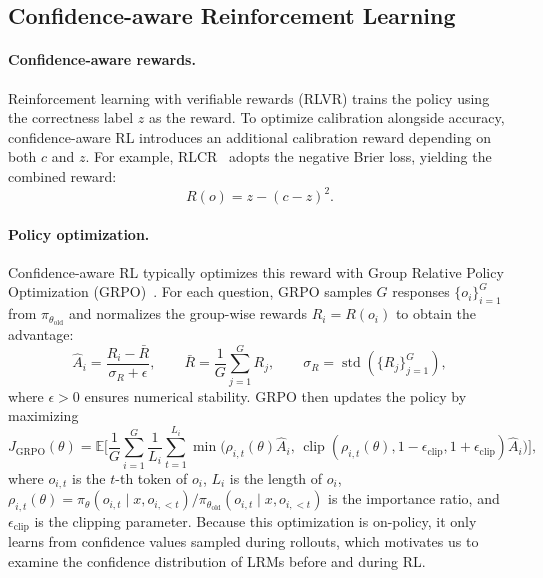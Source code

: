 \documentclass{article} %
\begin{document}
\subsection{Confidence-aware Reinforcement Learning}

\paragraph{Confidence-aware rewards.}
Reinforcement learning with verifiable rewards (RLVR) trains the policy using the correctness label $z$ as the reward.
To optimize calibration alongside accuracy, confidence-aware RL introduces an additional calibration reward depending on both $c$ and $z$.
For example, RLCR~\citep{damani2026beyond} adopts the negative Brier loss, yielding the combined reward:
\begin{equation}
    R(o)=z-(c-z)^2.
\end{equation}


\paragraph{Policy optimization.}
Confidence-aware RL typically optimizes this reward with Group Relative
Policy Optimization (GRPO)~\citep{shao2024deepseekmath}. For each
question, GRPO samples $G$ responses $\{o_i\}_{i=1}^{G}$ from $\pi_{\theta_{\mathrm{old}}}$ and normalizes the group-wise rewards
$R_i=R(o_i)$ to obtain the advantage:
\begin{equation}
    \widehat A_i=\frac{R_i-\bar R}{\sigma_R+\epsilon},\qquad
    \bar R=\frac{1}{G}\sum_{j=1}^{G}R_j,\qquad
    \sigma_R=\operatorname{std}\!\left(\{R_j\}_{j=1}^{G}\right),
\end{equation}
where $\epsilon>0$ ensures numerical stability. GRPO then updates the
policy by maximizing
\begin{equation}
J_{\mathrm{GRPO}}(\theta)=\mathbb E\Bigg[\frac{1}{G}\sum_{i=1}^{G}
\frac{1}{L_i}\sum_{t=1}^{L_i}\min\Big(\rho_{i,t}(\theta)\widehat A_i,\,
\operatorname{clip}\!\left(\rho_{i,t}(\theta),1-\epsilon_{\mathrm{clip}},
1+\epsilon_{\mathrm{clip}}\right)\widehat A_i\Big)\Bigg],
\end{equation}
where $o_{i,t}$ is the $t$-th token of $o_i$, $L_i$ is the length of
$o_i$, $\rho_{i,t}(\theta)=\pi_\theta(o_{i,t}\mid x,o_{i,<t})/
\pi_{\theta_{\mathrm{old}}}(o_{i,t}\mid x,o_{i,<t})$ is the importance
ratio, and $\epsilon_{\mathrm{clip}}$ is the clipping parameter.
Because this optimization is on-policy, it only learns from confidence values sampled during rollouts, which motivates us to examine the confidence distribution of LRMs before and during RL.
\end{document}
